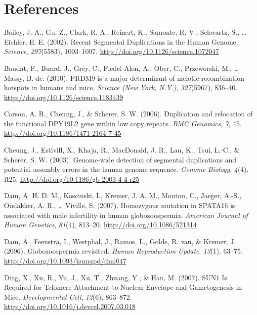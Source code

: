 \documentclass[12pt,twoside]{reedthesis}
\theoremstyle{definition}
\theoremstyle{definition}
\theoremstyle{remark}
\begin{document}
  \chapter*{References}\label{references}
  
  \hypertarget{refs}{}
  \hypertarget{ref-Bailey2002}{}
  Bailey, J. A., Gu, Z., Clark, R. A., Reinert, K., Samonte, R. V.,
  Schwartz, S., \ldots{} Eichler, E. E. (2002). Recent Segmental
  Duplications in the Human Genome. \emph{Science}, \emph{297}(5583),
  1003--1007. \url{http://doi.org/10.1126/science.1072047}
  
  \hypertarget{ref-Baudat2010}{}
  Baudat, F., Buard, J., Grey, C., Fledel-Alon, A., Ober, C., Przeworski,
  M., \ldots{} Massy, B. de. (2010). PRDM9 is a major determinant of
  meiotic recombination hotspots in humans and mice. \emph{Science (New
  York, N.Y.)}, \emph{327}(5967), 836--40.
  \url{http://doi.org/10.1126/science.1183439}
  
  \hypertarget{ref-Carson2006}{}
  Carson, A. R., Cheung, J., \& Scherer, S. W. (2006). Duplication and
  relocation of the functional DPY19L2 gene within low copy repeats.
  \emph{BMC Genomics}, \emph{7}, 45.
  \url{http://doi.org/10.1186/1471-2164-7-45}
  
  \hypertarget{ref-Cheung2003}{}
  Cheung, J., Estivill, X., Khaja, R., MacDonald, J. R., Lau, K., Tsui,
  L.-C., \& Scherer, S. W. (2003). Genome-wide detection of segmental
  duplications and potential assembly errors in the human genome sequence.
  \emph{Genome Biology}, \emph{4}(4), R25.
  \url{http://doi.org/10.1186/gb-2003-4-4-r25}
  
  \hypertarget{ref-Dam2007}{}
  Dam, A. H. D. M., Koscinski, I., Kremer, J. A. M., Moutou, C., Jaeger,
  A.-S., Oudakker, A. R., \ldots{} Viville, S. (2007). Homozygous mutation
  in SPATA16 is associated with male infertility in human globozoospermia.
  \emph{American Journal of Human Genetics}, \emph{81}(4), 813--20.
  \url{http://doi.org/10.1086/521314}
  
  \hypertarget{ref-Dam2006}{}
  Dam, A., Feenstra, I., Westphal, J., Ramos, L., Golde, R. van, \&
  Kremer, J. (2006). Globozoospermia revisited. \emph{Human Reproduction
  Update}, \emph{13}(1), 63--75.
  \url{http://doi.org/10.1093/humupd/dml047}
  
  \hypertarget{ref-Ding2007}{}
  Ding, X., Xu, R., Yu, J., Xu, T., Zhuang, Y., \& Han, M. (2007). SUN1 Is
  Required for Telomere Attachment to Nuclear Envelope and Gametogenesis
  in Mice. \emph{Developmental Cell}, \emph{12}(6), 863--872.
  \url{http://doi.org/10.1016/j.devcel.2007.03.018}
  
\end{document}
